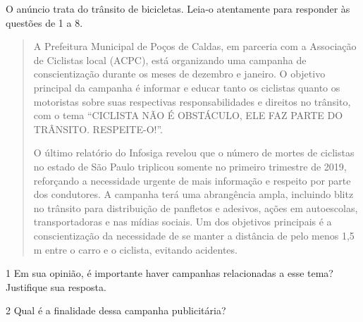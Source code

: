 O anúncio trata do trânsito de bicicletas. Leia-o atentamente para
responder às questões de 1 a 8.



\begin{quote}
A Prefeitura Municipal de Poços de Caldas, em parceria com a Associação
de Ciclistas local (ACPC), está organizando uma campanha de
conscientização durante os meses de dezembro e janeiro. O objetivo
principal da campanha é informar e educar tanto os ciclistas quanto os
motoristas sobre suas respectivas responsabilidades e direitos no
trânsito, com o tema ``CICLISTA NÃO É OBSTÁCULO, ELE FAZ PARTE DO
TRÂNSITO. RESPEITE-O!''.

O último relatório do Infosiga revelou que o número de mortes de
ciclistas no estado de São Paulo triplicou somente no primeiro trimestre
de 2019, reforçando a necessidade urgente de mais informação e respeito
por parte dos condutores. A campanha terá uma abrangência ampla,
incluindo blitz no trânsito para distribuição de panfletos e adesivos,
ações em autoescolas, transportadoras e nas mídias sociais. Um dos
objetivos principais é a conscientização da necessidade de se manter a
distância de pelo menos 1,5 m entre o carro e o ciclista, evitando
acidentes.

\end{quote}

\num{1} Em sua opinião, é importante haver campanhas relacionadas a esse tema? Justifique sua resposta.


\num{2} Qual é a finalidade dessa campanha publicitária?

